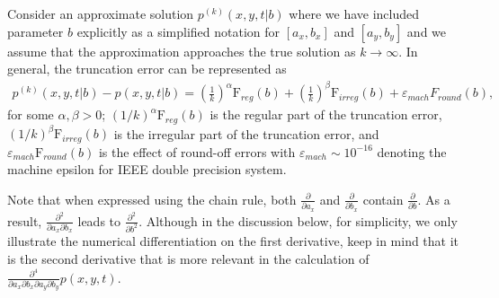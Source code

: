 Consider an approximate solution $p^{(k)}(\left. x, y, t \right| b)$
where we have included parameter $b $ explicitly as a simplified
notation for $[a_x, b_x]$ and $[a_y, b_y]$ and we assume that the
approximation approaches the true solution as $k \to \infty$. In
general, the truncation error can be represented as
\begin{align}
  p^{(k)}(x,y,t | b) - p(x,y,t | b) = \left( \frac{1}{k}
  \right)^{\alpha} \mbox{F}_{reg}(b) + \left( \frac{1}{k}
  \right)^{\beta}\mbox{F}_{irreg}(b) + \varepsilon_{mach}F_{round}(b), \label{eq:trunc-error}
\end{align}
for some $\alpha, \beta > 0$; $(1/k)^{\alpha} \mbox{F}_{reg}(b) $ is
the regular part of the truncation error,
$(1/k)^{\beta} \mbox{F}_{irreg}(b) $ is the irregular part of the
truncation error, and $\varepsilon_{mach} \mbox{F}_{round}(b) $ is the
effect of round-off errors with $\varepsilon_{mach} \sim 10^{-16}$
denoting the machine epsilon for IEEE double precision system.

Note that when expressed using the chain rule, both
$\displaystyle \frac{\partial}{\partial a_x}$ and
$\displaystyle \frac{\partial}{\partial b_x}$ contain
$\displaystyle \frac{\partial}{\partial b}$. As a result,
$\displaystyle \frac{\partial^2 }{\partial a_x \partial b_x} $ leads
to $\displaystyle \frac{\partial^2 }{\partial b^2} $. Although in the
discussion below, for simplicity, we only illustrate the numerical
differentiation on the first derivative, keep in mind that it is the
second derivative that is more relevant in the calculation of
$\displaystyle \frac{\partial^4}{\partial a_x \partial b_x \partial
  a_y \partial b_y} p(x, y, t) $.

